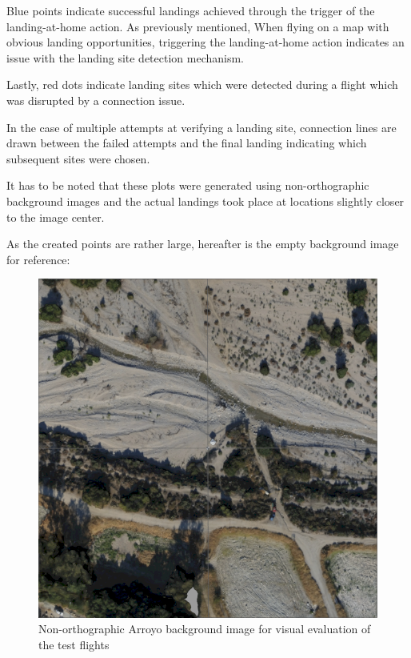Blue points indicate successful landings achieved through the trigger of the landing-at-home action. As previously mentioned, When flying on a map with obvious landing opportunities, triggering the landing-at-home action indicates an issue with the landing site detection mechanism.

Lastly, red dots indicate landing sites which were detected during a flight which was disrupted by a connection issue.

In the case of multiple attempts at verifying a landing site, connection lines are drawn between the failed attempts and the final landing indicating which subsequent sites were chosen.

It has to be noted that these plots were generated using non-orthographic background images and the actual landings took place at locations slightly closer to the image center.

As the created points are rather large, hereafter is the empty background image for reference:

\begin{figure}[h]
\centering
\includegraphics[scale=0.5]{images/evaluation/high_100m_arroyo_grid.png}
\caption{Non-orthographic Arroyo background image for visual evaluation of the test flights}
\label{fig:Arroyo_BG}
\end{figure}


